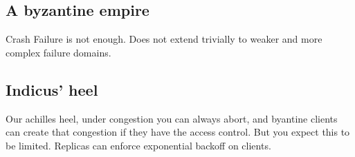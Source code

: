 \subsection{A byzantine empire}
Crash Failure is not enough. Does not extend trivially to weaker and more complex failure domains.

\subsection{Indicus' heel}
Our achilles heel, under congestion you can always abort, and byantine clients can create that congestion if they have the access control. But you expect this to be limited. 
Replicas can enforce exponential backoff on clients.